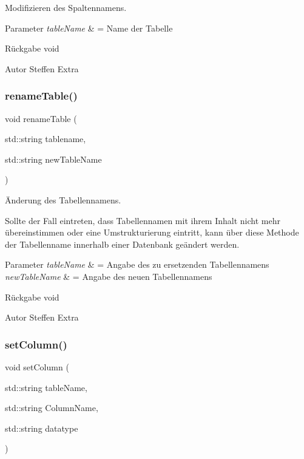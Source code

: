 Modifizieren des Spaltennamens. 


\begin{DoxyParams}{Parameter}
{\em table\+Name} & = Name der Tabelle\\
\hline
\end{DoxyParams}
\begin{DoxyReturn}{Rückgabe}
void
\end{DoxyReturn}
\begin{DoxyAuthor}{Autor}
Steffen Extra 
\end{DoxyAuthor}
\mbox{\label{tables_8cpp_a526b049a888b2a4a1332a10540689afd}} 
\subsubsection{rename\+Table()}
{\footnotesize\ttfamily void rename\+Table (\begin{DoxyParamCaption}\item[{std\+::string}]{tablename,  }\item[{std\+::string}]{new\+Table\+Name }\end{DoxyParamCaption})}



Änderung des Tabellennamens. 

Sollte der Fall eintreten, dass Tabellennamen mit ihrem Inhalt nicht mehr übereinstimmen oder eine Umstrukturierung eintritt, kann über diese Methode der Tabellenname innerhalb einer Datenbank geändert werden.


\begin{DoxyParams}{Parameter}
{\em table\+Name} & = Angabe des zu ersetzenden Tabellennamens \\
\hline
{\em new\+Table\+Name} & = Angabe des neuen Tabellennamens\\
\hline
\end{DoxyParams}
\begin{DoxyReturn}{Rückgabe}
void
\end{DoxyReturn}
\begin{DoxyAuthor}{Autor}
Steffen Extra 
\end{DoxyAuthor}
\mbox{\label{tables_8cpp_a7c4575b6ed6eb203c2796930c41ed555}} 
\subsubsection{set\+Column()}
{\footnotesize\ttfamily void set\+Column (\begin{DoxyParamCaption}\item[{std\+::string}]{table\+Name,  }\item[{std\+::string}]{Column\+Name,  }\item[{std\+::string}]{datatype }\end{DoxyParamCaption})}



